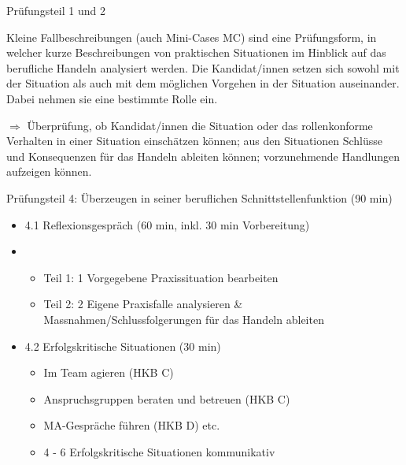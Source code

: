 \begin{frame}{Prüfungsteil 1 und 2}

\begin{myLernziele}
Kleine Fallbeschreibungen (auch Mini-Cases MC) sind eine Prüfungsform, in welcher kurze Beschreibungen von praktischen Situationen im Hinblick auf das berufliche Handeln analysiert werden. Die Kandidat/innen setzen sich sowohl mit der Situation als auch mit dem möglichen Vorgehen in der Situation auseinander. Dabei nehmen sie eine bestimmte Rolle ein.
    \vspace{1em}

    $\Rightarrow$ Überprüfung, ob Kandidat/innen die Situation oder das rollenkonforme Verhalten in einer Situation einschätzen können;  aus den Situationen Schlüsse und Konsequenzen für das Handeln ableiten können; vorzunehmende Handlungen aufzeigen können.
\end{myLernziele}

\end{frame}




\begin{frame}{Prüfungsteil 4: Überzeugen in seiner beruflichen Schnittstellenfunktion (90 min)}
    \begin{itemize}
        \item 4.1 Reflexionsgespräch (60 min, inkl. 30 min Vorbereitung)
        \item \begin{itemize}
            \item Teil 1: 1 Vorgegebene Praxissituation bearbeiten 
            \item Teil 2: 2 Eigene Praxisfalle analysieren \& Massnahmen/Schlussfolgerungen für das Handeln ableiten
        \end{itemize}
        \item 4.2 Erfolgskritische Situationen (30 min)
        \begin{itemize}
            \item Im Team agieren (HKB C)
            \item Anspruchsgruppen beraten und betreuen (HKB C)
            \item MA-Gespräche führen (HKB D) etc.
            \item 4 - 6 Erfolgskritische Situationen kommunikativ
        \end{itemize}
    \end{itemize}
\end{frame}



